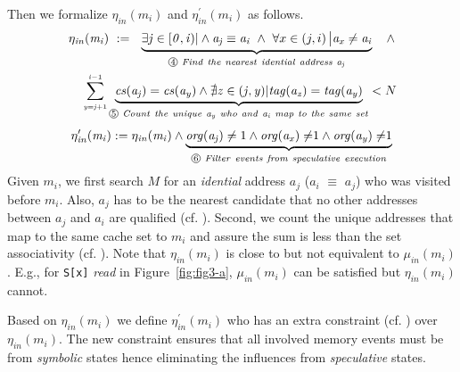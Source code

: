 \documentclass[sigconf, review]{acmart}
\newcommand*\circled[1]{\tikz[baseline=(char.base)]{
				\node[shape=circle,draw,inner sep=.4pt] (char) {\scriptsize{#1}};}}
\begin{document}
Then we formalize $\mathit{\eta_{in}(m_i)}$ and $\mathit{\eta^\prime_{in}(m_i)}$ as follows. 
%
\begin{multline}
  \label{eqn:hc1}
    \mathit{\eta_{in}(m_i)}~:=~~ 
     \underbrace{ 
      \exists\mathit{j}\in[\mathit{0,i})|
      \wedge 
      \mathit{a_j}\equiv\mathit{a_i} 
    ~\wedge~
      {\forall}x\in\left(j,i\right)\big|\mathit{a_x}\ne\mathit{a_i}
    }_{{\circled{4}}\mathit{~Find~the~nearest~idential~address~a_j}}
		~~~\wedge 
		\\
    ~~~~\sum_{{\scriptscriptstyle \mathit{y=j}+1}}^{{\scriptscriptstyle \mathit{i-}1}} 
    \underbrace{
      \mathit{cs(a_j)}=\mathit{cs(a_y)} 
      \wedge
      \nexists\mathit{z}\in(\mathit{j,y})|\mathit{tag(a_z)}=\mathit{tag(a_y)}
    }_{{\circled{5}}\mathit{~Count~the~unique~a_y~who~and~a_i~map~to~the~same~set}}
    <N
\end{multline}
\vspace{.2ex}
\begin{multline}
  \label{eqn:hc2}
    \mathit{\eta^\prime_{in}(m_i)}:=\mathit{\eta_{in}(m_i)}\wedge
    \underbrace{
      \mathit{org(a_j)}\ne1 
      \wedge
      \mathit{org(a_x)\ne}1 
      \wedge
      \mathit{org(a_y)\ne}1 
    }_{{\circled{6}}\mathit{~Filter~events~from~speculative~execution}}
\end{multline}
%
%
Given $\mathit{m_i}$, we first search $\mathit{M}$ for an \textit{idential} 
address $\mathit{a_j}$ ($\mathit{a_i}$ $\equiv$ $\mathit{a_j}$) who was 
visited before $\mathit{m_i}$. Also, $\mathit{a_j}$ has to be the nearest 
candidate that no other addresses between $\mathit{a_j}$ and $\mathit{a_i}$ 
are qualified (cf. \circled{4}). Second, we count the unique addresses that 
map to the same cache set to $\mathit{m_i}$ and assure the sum is less than 
the set associativity (cf. \circled{5}). Note that $\mathit{\eta_{in}(m_i)}$ 
is close to but not equivalent to $\mathit{\mu_{in}(m_i)}$. E.g., for 
\texttt{S[x]} \textit{read} in Figure~\ref{fig:fig3-a}, $\mathit{\mu_{in}(m_i)}$ 
can be satisfied but $\mathit{\eta_{in}(m_i)}$ cannot.

Based on $\mathit{\eta_{in}(m_i)}$ we define $\mathit{\eta^\prime_{in}(m_i)}$
who has an extra constraint (cf. \circled{6}) over $\mathit{\eta_{in}(m_i)}$. 
The new constraint ensures that all involved memory events must be from 
\textit{symbolic} states hence eliminating the influences from 
\textit{speculative} states.
\end{document}
